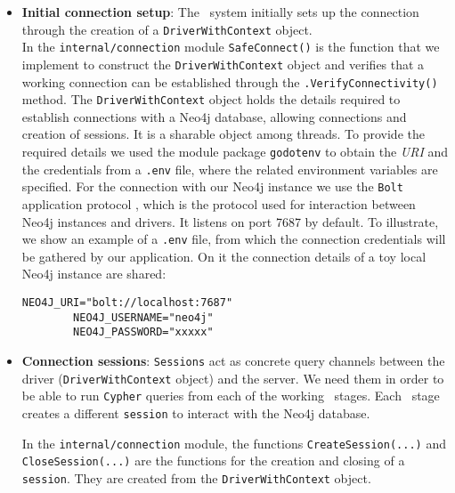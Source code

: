 \begin{itemize}
    \item \textbf{Initial connection setup}: The \DPATM\ system initially sets up the connection through the creation of a \texttt{DriverWithContext} object.\\
    In the \texttt{internal/connection} module \texttt{SafeConnect()} is the function that we implement to construct the \texttt{DriverWithContext} object and verifies that a working connection can be established through the \texttt{.VerifyConnectivity()} method.
    The \texttt{DriverWithContext} object holds the details required to establish connections with a Neo4j database, allowing connections and creation of sessions. It is a sharable object among threads. To provide the required details we used the module package \texttt{godotenv} \cite{godotenv} to obtain the \textit{URI} and the credentials from a \texttt{.env} file, where the related environment variables are specified. For the connection with our Neo4j instance we use the \texttt{Bolt} application protocol \cite{bolt-protocol}, which is the protocol used for interaction between Neo4j instances and drivers. It listens on port 7687 by default. 
    To illustrate, we show an example of a \texttt{.env} file, from which the connection credentials will be gathered by our application. On it the connection details of a toy local Neo4j instance are shared:

    \begin{center}
    \lstset{style=cypherStyle}
    \begin{lstlisting}[caption={Example of a \texttt{.env} file, from which from which the connection credentials will be gathered by our \DPATM\ application.}]
        NEO4J_URI="bolt://localhost:7687"
        NEO4J_USERNAME="neo4j"
        NEO4J_PASSWORD="xxxxx"
    \end{lstlisting}
    \end{center}

    \item \textbf{Connection sessions}: \texttt{Sessions} act as concrete query channels between the driver (\texttt{DriverWithContext} object) and the server. We need them in order to be able to run \texttt{Cypher} queries from each of the working \filter\ stages. Each \filter\ stage creates a different \texttt{session} to interact with the Neo4j database.
    
    In the \texttt{internal/connection} module, the functions \texttt{CreateSession(...)} and \texttt{CloseSession(...)} are the functions for the creation and closing of a \texttt{session}.
    They are created from the \texttt{DriverWithContext} object. 


\end{itemize}
